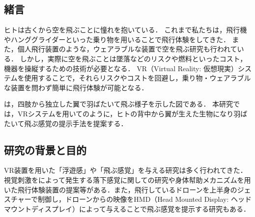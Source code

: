 \begin{small}

\section{緒言}

  ヒトは古くから空を飛ぶことに憧れを抱いている．
  これまで私たちは，飛行機やハンググライダーといった乗り物を用いることで飛行体験をしてきた．
  また，個人飛行装置のような，ウェアラブルな装置で空を飛ぶ研究も行われている\cite{gravityindustries}．
  しかし，実際に空を飛ぶことは墜落などのリスクや燃料といったコスト，機器を操縦するための技術が必要となる．
  VR（Virtual Reality: 仮想現実）システムを使用することで，それらリスクやコストを回避し，乗り物・ウェアラブルな装置を問わず簡単に飛行体験が可能となる．

  は，四肢から独立した翼で羽ばたいて飛ぶ様子を示した図である．
  本研究では，VRシステムを用いてのように，ヒトの背中から翼が生えた生物になり羽ばたいて飛ぶ感覚の提示手法を提案する．
  

  \subsection{研究の背景と目的}
    VR装置を用いた「浮遊感」や「飛ぶ感覚」を与える研究は多く行われてきた．視覚刺激をによって発生する落下感覚に関しての研究\cite{奥川夏輝2017VR空間における視覚刺激によって発生する落下感覚の分析}や身体幇助メカニズムを用いた飛行体験装置の提案\cite{鈴木拓馬2014hmd}等がある．また，飛行しているドローンを上半身のジェスチャーで制御し，ドローンからの映像をHMD（Head Mounted Display: ヘッドマウントディスプレイ）によって与えることで飛ぶ感覚を提示する研究\cite{rognon2018flyjacket}もある．



\end{small}
